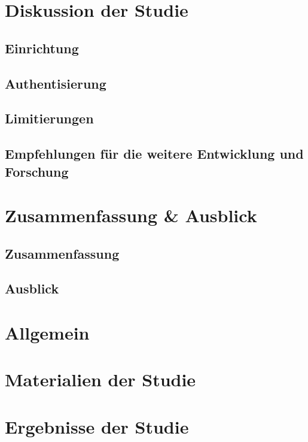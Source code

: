 \documentclass[doktyp=marbeit, twoside]{TUBAFarbeiten}
\begin{document}
\newpage
\section{Diskussion der Studie}
    \label{sec: diskussion}
    

    \subsection{Einrichtung}
        \label{sec: diskussion einrichtung}
        

    \subsection{Authentisierung}
        \label{sec: diskussion auth}
        

    \subsection{Limitierungen}
        \label{sec: diskussion limit}
        

    \subsection{Empfehlungen für die weitere Entwicklung und Forschung}
        \label{sec: diskussion empfehlung}
        

\newpage
\section{Zusammenfassung \& Ausblick}
    \subsection{Zusammenfassung}
        \label{sec: outro zusammenfassung}
        

    \subsection{Ausblick}
        \label{sec: outro ausblick}
        

\newpage
\printbibliography[title=Literaturverzeichnis, heading=bibintoc]

\newpage
\appendix
{}
\section{Allgemein}
    
\newpage
    \section{Materialien der Studie}
    
\newpage
\section{Ergebnisse der Studie}
        
\end{document}
